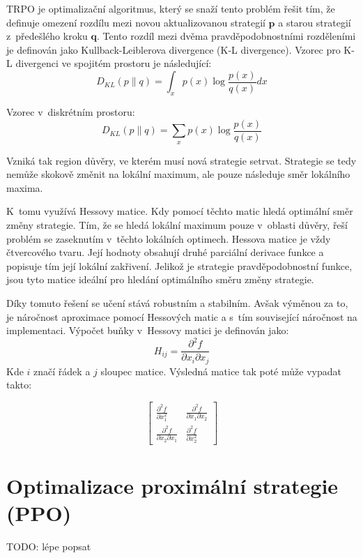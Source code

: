 TRPO je optimalizační algoritmus, který se snaží tento problém řešit tím, že definuje omezení rozdílu mezi novou aktualizovanou strategií $\textbf{p}$ a starou strategií z~předešlého kroku $\textbf{q}$.
Tento rozdíl mezi dvěma pravděpodobnostními rozděleními je definován jako Kullback-Leiblerova divergence (K-L divergence)\cite{KL_divergence}.
Vzorec pro K-L divergenci ve spojitém prostoru je následující:
\begin{equation}
  D_{KL}(p \| q) = \int_x p(x) \log \frac{p(x)}{q(x)} dx
\end{equation}

Vzorec v~diskrétním prostoru:
\begin{equation}
  D_{KL}(p \| q) = \sum_x p(x) \log \frac{p(x)}{q(x)}
\end{equation}

Vzniká tak region důvěry, ve kterém musí nová strategie setrvat.
Strategie se tedy nemůže skokově změnit na lokální maximum, ale pouze následuje směr lokálního maxima.

K~tomu využívá Hessovy matice.
Kdy pomocí těchto matic hledá optimální směr změny strategie.
Tím, že se hledá lokální maximum pouze v~oblasti důvěry, řeší problém se zaseknutím v~těchto lokálních optimech.
Hessova matice je vždy čtvercového tvaru.
Její hodnoty obsahují druhé parciální derivace funkce a popisuje tím její lokální zakřivení.
Jelikož je strategie pravděpodobnostní funkce, jsou tyto matice ideální pro hledání optimálního směru změny strategie.

Díky tomuto řešení se učení stává robustním a stabilním.
Avšak výměnou za to, je náročnost aproximace pomocí Hessových matic a s~tím související náročnost na implementaci.
Výpočet buňky v~Hessovy matici je definován jako:
\begin{equation}
  H_{ij} = \frac{\partial^2 f}{\partial x_i \partial x_j}
\end{equation}
Kde $i$ značí řádek a $j$ sloupec matice.
Výsledná matice tak poté může vypadat takto:

\begin{equation}
  \begin{bmatrix}
     \frac{\partial^2 f}{\partial x_1^2} & \frac{\partial^2 f}{\partial x_1 \partial x_2} \\
     \frac{\partial^2 f}{\partial x_2 \partial x_1} & \frac{\partial^2 f}{\partial x_2^2}
   \end{bmatrix}
\end{equation}

\section{Optimalizace proximální strategie (PPO)}
\label{sec:proximalni-optimalizace-strategie}
{\color{red}TODO: lépe popsat}

